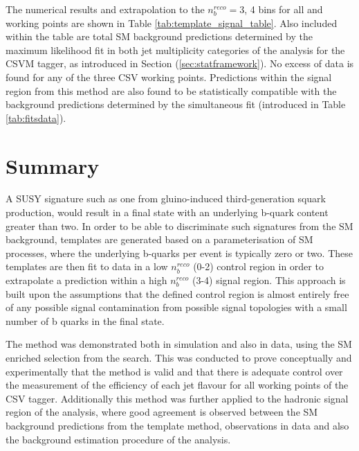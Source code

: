 The numerical results and extrapolation to the $n_{b}^{reco} =$3, 4 bins for all \theht and working points are shown in Table \ref{tab:template_signal_table}. Also included within the table are total \ac{SM} background predictions determined by the maximum likelihood fit in both jet multiplicity categories of the \alphat analysis for the \ac{CSVM} tagger, as introduced in Section (\ref{sec:statframework}). No excess of data is found for any of the three \ac{CSV} working points. Predictions within the signal region from this method are also found to be statistically compatible with the background predictions determined by the \alphat simultaneous fit (introduced in Table \ref{tab:fitsdata}).

\section{Summary}
\label{subsec:templateconclusions}

A \ac{SUSY} signature such as one from gluino-induced third-generation squark production, would result in a final state with an underlying b-quark content greater than two. In order to be able to discriminate such signatures from the \ac{SM} background, templates are generated based on a parameterisation of \ac{SM} processes, where the underlying b-quarks per event is typically zero or two. These templates are then fit to data in a low $n_{b}^{reco}$ (0-2) control region in order to extrapolate a prediction within a high $n_{b}^{reco}$ (3-4) signal region. This approach is built upon the assumptions that the defined control region is almost entirely free of any possible signal contamination from possible signal topologies with a small number of b quarks in the final state.

The method was demonstrated both in simulation and also in data, using the \ac{SM} enriched \mupjets selection from the \alphat search. This was conducted to prove conceptually and experimentally that the method is valid and that there is adequate control over the measurement of the efficiency of each jet flavour for all working points of the \ac{CSV} tagger. Additionally this method was further applied to the hadronic signal region of the \alphat analysis, where good agreement is observed between the \ac{SM} background predictions from the template method, observations in data and also the background estimation procedure of the \alphat analysis.


